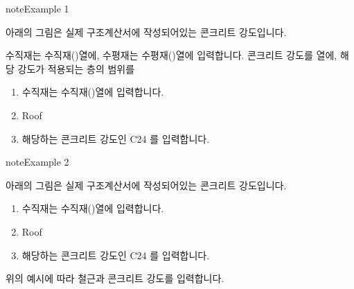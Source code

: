 \documentclass[a4paper,10pt,korean]{sphinxmanual}
\begin{document}
\begin{sphinxadmonition}{note}{Example 1}

\sphinxAtStartPar
아래의 그림은 실제 구조계산서에 작성되어있는 콘크리트 강도입니다.

\begin{figure}[H]
\centering

\noindent{}
\end{figure}

\sphinxAtStartPar
수직재는 수직재()열에, 수평재는 수평재()열에 입력합니다.
콘크리트 강도를 열에, 해당 강도가 적용되는 층의 범위를
\begin{enumerate}
%
\item {} 
\sphinxAtStartPar
수직재는 수직재()열에 입력합니다.

\item {} 
\sphinxAtStartPar
Roof

\item {} 
\sphinxAtStartPar
해당하는 콘크리트 강도인 C24 를 입력합니다.

\end{enumerate}
\end{sphinxadmonition}

\begin{sphinxadmonition}{note}{Example 2}

\sphinxAtStartPar
아래의 그림은 실제 구조계산서에 작성되어있는 콘크리트 강도입니다.
\begin{enumerate}
%
\item {} 
\sphinxAtStartPar
수직재는 수직재()열에 입력합니다.

\item {} 
\sphinxAtStartPar
Roof

\item {} 
\sphinxAtStartPar
해당하는 콘크리트 강도인 C24 를 입력합니다.

\end{enumerate}
\end{sphinxadmonition}

\begin{sphinxShadowBox}

\sphinxAtStartPar
위의 예시에 따라 철근과 콘크리트 강도를 입력합니다.
\end{sphinxShadowBox}
\end{document}
